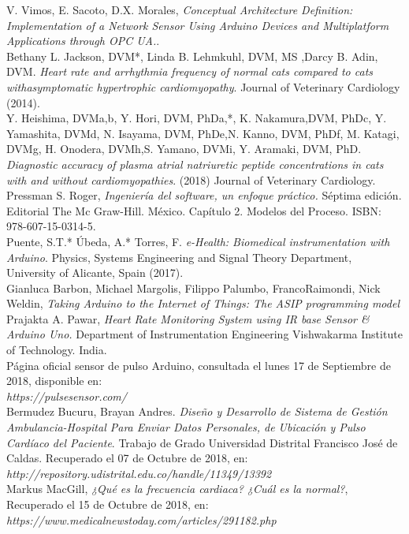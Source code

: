 \documentclass[letterpaper, 10 pt, conference]{ieeeconf}  %
\begin{document}
\begin{thebibliography}{99}

 V. Vimos, E. Sacoto, D.X. Morales, \textit{Conceptual Architecture Definition: Implementation of a Network Sensor Using Arduino Devices and Multiplatform Applications through OPC UA.}.\\

 Bethany L. Jackson, DVM*, Linda B. Lehmkuhl, DVM, MS ,Darcy B. Adin, DVM. \textit{Heart rate and arrhythmia frequency of normal cats compared to cats withasymptomatic hypertrophic cardiomyopathy}. Journal of Veterinary Cardiology (2014). \\ 

 Y. Heishima, DVMa,b, Y. Hori, DVM, PhDa,*, K. Nakamura,DVM, PhDc, Y. Yamashita, DVMd, N. Isayama, DVM, PhDe,N. Kanno, DVM, PhDf, M. Katagi, DVMg, H. Onodera, DVMh,S. Yamano, DVMi, Y. Aramaki, DVM, PhD. \textit{Diagnostic accuracy of plasma atrial natriuretic peptide concentrations in cats with and without cardiomyopathies}.  (2018) Journal of Veterinary Cardiology. \\

 Pressman S. Roger, \textit{Ingenier\'ia del software, un enfoque pr\'actico.} S\'eptima edici\'on. Editorial The Mc Graw-Hill. M\'exico. Cap\'itulo 2. Modelos del Proceso. ISBN: 978-607-15-0314-5.\\

 Puente, S.T.* Úbeda, A.* Torres, F. \textit{e-Health: Biomedical instrumentation with Arduino}. Physics, Systems Engineering and Signal Theory Department, University of Alicante, Spain (2017).\\

 Gianluca Barbon, Michael Margolis, Filippo Palumbo, FrancoRaimondi, Nick Weldin, \textit{Taking Arduino to the Internet of Things: The ASIP programming model}\\

 Prajakta A. Pawar, \textit{Heart Rate Monitoring System using IR base Sensor \& Arduino Uno.} Department of Instrumentation Engineering Vishwakarma  Institute of  Technology. India.\\

 P\'agina oficial sensor de pulso Arduino, consultada el lunes 17 de Septiembre de 2018, disponible en:\\ \textit{https://pulsesensor.com/}\\

 Bermudez Bucuru, Brayan Andres. \textit{Dise\~no y Desarrollo de Sistema de Gesti\'on Ambulancia-Hospital Para Enviar Datos Personales, de Ubicaci\'on y Pulso Card\'iaco del Paciente}. Trabajo de Grado Universidad Distrital Francisco Jos\'e de Caldas. Recuperado el 07 de Octubre de 2018, en: \textit{http://repository.udistrital.edu.co/handle/11349/13392}\\

 Markus MacGill, \textit{¿Qu\'e es la frecuencia cardiaca? ¿Cu\'al es la normal?}, Recuperado el 15 de Octubre de 2018, en: \textit{https://www.medicalnewstoday.com/articles/291182.php}\\

\end{thebibliography}
\end{document}
